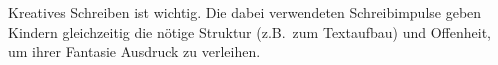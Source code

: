 Kreatives Schreiben ist wichtig.
Die dabei verwendeten Schreibimpulse geben Kindern gleichzeitig die nötige Struktur (z.B.\ zum Textaufbau) und Offenheit, um ihrer Fantasie Ausdruck zu verleihen.